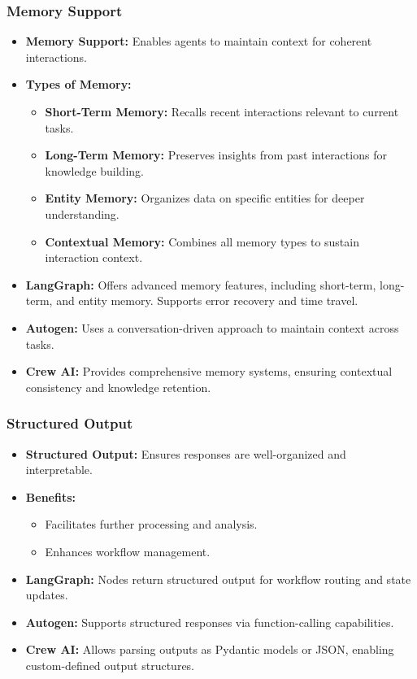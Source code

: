 \begin{frame}[fragile]\frametitle{Memory Support}
\begin{itemize}
    \item \textbf{Memory Support:} Enables agents to maintain context for coherent interactions.
    \item \textbf{Types of Memory:}
    \begin{itemize}
        \item \textbf{Short-Term Memory:} Recalls recent interactions relevant to current tasks.
        \item \textbf{Long-Term Memory:} Preserves insights from past interactions for knowledge building.
        \item \textbf{Entity Memory:} Organizes data on specific entities for deeper understanding.
        \item \textbf{Contextual Memory:} Combines all memory types to sustain interaction context.
    \end{itemize}
    \item \textbf{LangGraph:} Offers advanced memory features, including short-term, long-term, and entity memory. Supports error recovery and time travel.
    \item \textbf{Autogen:} Uses a conversation-driven approach to maintain context across tasks.
    \item \textbf{Crew AI:} Provides comprehensive memory systems, ensuring contextual consistency and knowledge retention.
\end{itemize}
\end{frame}

\begin{frame}[fragile]\frametitle{Structured Output}
\begin{itemize}
    \item \textbf{Structured Output:} Ensures responses are well-organized and interpretable.
    \item \textbf{Benefits:}
    \begin{itemize}
        \item Facilitates further processing and analysis.
        \item Enhances workflow management.
    \end{itemize}
    \item \textbf{LangGraph:} Nodes return structured output for workflow routing and state updates.
    \item \textbf{Autogen:} Supports structured responses via function-calling capabilities.
    \item \textbf{Crew AI:} Allows parsing outputs as Pydantic models or JSON, enabling custom-defined output structures.
\end{itemize}
\end{frame}

